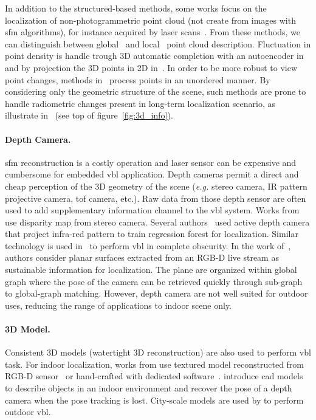 			In addition to the structured-based methods, some works focus on the localization of non-photogrammetric point cloud (\ie not create from images with \ac{sfm} algorithms), for instance acquired by laser scans~\citep{Elbaz2017,Uy2018,Schonberger2017a,Zeng2016,Yew2018,Deng2018}. From these methods, we can distinguish between global~\citep{Uy2018,Schonberger2017a} and local~\citep{Elbaz2017,Zeng2016,Yew2018,Deng2018} point cloud description. Fluctuation in point density is handle trough 3D automatic completion with an autoencoder in~\citep{Schonberger2017a} and by projection the 3D points in 2D in~\citep{Elbaz2017}. In order to be more robust to view point changes, methods in~\citep{Yew2018,Deng2018} process points in an unordered manner. By considering only the geometric structure of the scene, such methods are prone to handle radiometric changes present in long-term localization scenario, as illustrate in~\citep{Schonberger2017a,Uy2018} (see top of figure~\ref{fig:3d_info}).

		\paragraph{Depth Camera.}
			\Ac{sfm} reconstruction is a costly operation and laser sensor can be expensive and cumbersome for embedded \ac{vbl} application. Depth cameras permit a direct and cheap perception of the 3D geometry of the scene (\textit{e.g.} stereo camera, IR pattern projective camera, \ac{tof} camera, etc.). Raw data from those depth sensor are often used to add supplementary information channel to the \ac{vbl} system. Works from~\citep{Ni2009,McManus2014,Wan2014} use disparity map from stereo camera. Several authors~\citep{Shotton2013,Guzman-rivera2014,Glocker2015} used active depth camera that project infra-red pattern to train regression forest for localization. Similar technology is used in~\citep{Li2016a} to perform \ac{vbl} in complete obscurity. In the work of~\citep{Fernandez-Moral2013}, authors consider planar surfaces extracted from an RGB-D live stream as sustainable information for localization. The plane are organized within global graph where the pose of the camera can be retrieved quickly through sub-graph to global-graph matching.  However, depth camera are not well suited for outdoor uses, reducing the range of applications to indoor scene only.

		\paragraph{3D Model.}
			Consistent 3D models (\ie watertight 3D reconstruction) are also used to perform \ac{vbl} task.  For indoor localization, works from \citep{Shotton2013,Pascoe2015,Taira2018,Taira2019} use textured model reconstructed from RGB-D sensor~\citep{Shotton2013} or hand-crafted with dedicated software~\citep{Pascoe2015}. \citet{Salas-Moreno2013} introduce \ac{cad} models to describe objects in an indoor environment and recover the pose of a depth camera when the pose tracking is lost. City-scale models are used by \citep{Aubry2014,Poglitsch2015,Pascoe2015a,Pascoe2015b,Caselitz2016} to perform outdoor \ac{vbl}. 


